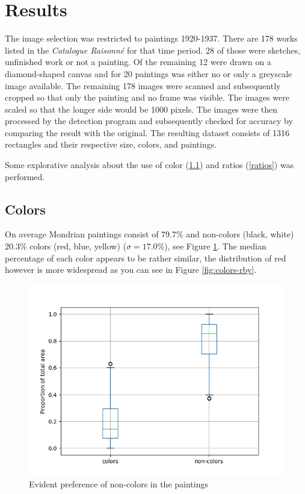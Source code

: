 \documentclass[serif,article,noparskip]{agse-thesis}
\begin{document}
\section{Results} \label{results}

 The image selection was restricted to paintings 1920-1937. There are 178 works
 listed in the \textit{Catalogue Raisonn{\'e}} \cite{joosten1998} for that time
 period. 28 of those were sketches, unfinished work or not a painting. Of the
 remaining 12 were drawn on a diamond-shaped canvas and for 20 paintings was
 either no or only a greyscale image available. The remaining 178 images were
 scanned and subsequently cropped so that only the painting and no frame was
 visible.  The images were scaled so that the longer side would be 1000
 pixels. The images were then processed by the detection program and subsequently
 checked for accuracy by comparing the result with the original. The resulting
 dataset consists of 1316 rectangles and their respective size, colors, and
 paintings.

Some explorative analysis about the use of color (\ref{color}) and ratios
(\ref{ratios}) was performed.

\subsection{Colors} \label{color}

On average Mondrian paintings consist of 79.7\%  and non-colors (black, white)
20.3\% colors (red, blue, yellow) ($\sigma = 17.0\%$), see Figure
\ref{fig:colors-noncolors}. The median percentage of each color appears to be
rather similar, the distribution of red however is more widespread as you can
see in Figure \ref{fig:colors-rby}.

\begin{figure}
\includegraphics[width=\linewidth]{images/colors-non-colors.png}
\caption{Evident preference of non-colors in the paintings}
\label{fig:colors-noncolors}
\end{figure}
\end{document}
